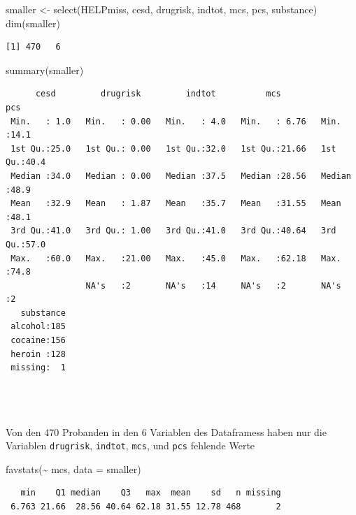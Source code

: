\documentclass[
  ngerman,
]{scrbook}
\newenvironment{Shaded}{\begin{snugshade}}{\end{snugshade}}
\newcommand{\AttributeTok}[1]{\textcolor[rgb]{0.77,0.63,0.00}{#1}}
\newcommand{\FunctionTok}[1]{\textcolor[rgb]{0.00,0.00,0.00}{#1}}
\newcommand{\NormalTok}[1]{#1}
\newcommand{\OtherTok}[1]{\textcolor[rgb]{0.56,0.35,0.01}{#1}}
\newcommand{\SpecialCharTok}[1]{\textcolor[rgb]{0.00,0.00,0.00}{#1}}
\begin{document}
\begin{Shaded}
\begin{Highlighting}[]
\NormalTok{smaller }\OtherTok{\textless{}{-}} \FunctionTok{select}\NormalTok{(HELPmiss, cesd, drugrisk, indtot, mcs, pcs, substance)}
\FunctionTok{dim}\NormalTok{(smaller)}
\end{Highlighting}
\end{Shaded}

\begin{verbatim}
[1] 470   6
\end{verbatim}

\begin{Shaded}
\begin{Highlighting}[]
\FunctionTok{summary}\NormalTok{(smaller)}
\end{Highlighting}
\end{Shaded}

\begin{verbatim}
      cesd         drugrisk         indtot          mcs             pcs      
 Min.   : 1.0   Min.   : 0.00   Min.   : 4.0   Min.   : 6.76   Min.   :14.1  
 1st Qu.:25.0   1st Qu.: 0.00   1st Qu.:32.0   1st Qu.:21.66   1st Qu.:40.4  
 Median :34.0   Median : 0.00   Median :37.5   Median :28.56   Median :48.9  
 Mean   :32.9   Mean   : 1.87   Mean   :35.7   Mean   :31.55   Mean   :48.1  
 3rd Qu.:41.0   3rd Qu.: 1.00   3rd Qu.:41.0   3rd Qu.:40.64   3rd Qu.:57.0  
 Max.   :60.0   Max.   :21.00   Max.   :45.0   Max.   :62.18   Max.   :74.8  
                NA's   :2       NA's   :14     NA's   :2       NA's   :2     
   substance  
 alcohol:185  
 cocaine:156  
 heroin :128  
 missing:  1  
              
              
              
\end{verbatim}

Von den 470 Probanden in den 6 Variablen des Dataframess haben nur die Variablen \texttt{drugrisk}, \texttt{indtot}, \texttt{mcs}, und \texttt{pcs} fehlende Werte

\begin{Shaded}
\begin{Highlighting}[]
\FunctionTok{favstats}\NormalTok{(}\SpecialCharTok{\textasciitilde{}}\NormalTok{ mcs, }\AttributeTok{data =}\NormalTok{ smaller)}
\end{Highlighting}
\end{Shaded}

\begin{verbatim}
   min    Q1 median    Q3   max  mean    sd   n missing
 6.763 21.66  28.56 40.64 62.18 31.55 12.78 468       2
\end{verbatim}
\end{document}
